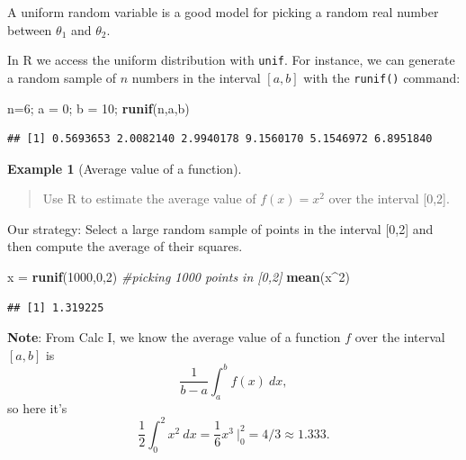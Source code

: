 \documentclass[
]{book}
\newenvironment{Shaded}{\begin{snugshade}}{\end{snugshade}}
\newcommand{\CommentTok}[1]{\textcolor[rgb]{0.56,0.35,0.01}{\textit{#1}}}
\newcommand{\DecValTok}[1]{\textcolor[rgb]{0.00,0.00,0.81}{#1}}
\newcommand{\FunctionTok}[1]{\textcolor[rgb]{0.13,0.29,0.53}{\textbf{#1}}}
\newcommand{\NormalTok}[1]{#1}
\newcommand{\OtherTok}[1]{\textcolor[rgb]{0.56,0.35,0.01}{#1}}
\newcommand{\SpecialCharTok}[1]{\textcolor[rgb]{0.81,0.36,0.00}{\textbf{#1}}}
\theoremstyle{definition}
\theoremstyle{definition}
\newtheorem{example}{Example}[chapter]
\theoremstyle{definition}
\theoremstyle{definition}
\theoremstyle{remark}
\begin{document}
A uniform random variable is a good model for picking a random real number between \(\theta_1\) and \(\theta_2\).

In R we access the uniform distribution with \texttt{unif}. For instance, we can generate a random sample of \(n\) numbers in the interval \([a,b]\) with the \texttt{runif()} command:

\begin{Shaded}
\begin{Highlighting}[]
\NormalTok{n}\OtherTok{=}\DecValTok{6}\NormalTok{; a }\OtherTok{=} \DecValTok{0}\NormalTok{; b }\OtherTok{=} \DecValTok{10}\NormalTok{;}
\FunctionTok{runif}\NormalTok{(n,a,b)}
\end{Highlighting}
\end{Shaded}

\begin{verbatim}
## [1] 0.5693653 2.0082140 2.9940178 9.1560170 5.1546972 6.8951840
\end{verbatim}

\begin{example}[Average value of a function]
\leavevmode

\begin{quote}
Use R to estimate the average value of \(f(x) = x^2\) over the interval {[}0,2{]}.
\end{quote}

Our strategy: Select a large random sample of points in the interval {[}0,2{]} and then compute the average of their squares.

\begin{Shaded}
\begin{Highlighting}[]
\NormalTok{x }\OtherTok{=} \FunctionTok{runif}\NormalTok{(}\DecValTok{1000}\NormalTok{,}\DecValTok{0}\NormalTok{,}\DecValTok{2}\NormalTok{) }\CommentTok{\#picking 1000 points in [0,2]}
\FunctionTok{mean}\NormalTok{(x}\SpecialCharTok{\^{}}\DecValTok{2}\NormalTok{)}
\end{Highlighting}
\end{Shaded}

\begin{verbatim}
## [1] 1.319225
\end{verbatim}

\textbf{Note}: From Calc I, we know the average value of a function \(f\) over the interval \([a,b]\) is \[\frac{1}{b-a} \int_a^b f(x)~dx,\]
so here it's \[\frac{1}{2}\int_0^2 x^2~dx = \frac{1}{6} x^3 ~\biggr|_0^2 = 4/3 \approx 1.333.\]

\end{example}
\end{document}
